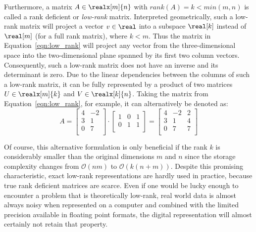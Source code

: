 Furthermore, a matrix $A \in \realx[m]{n}$ with $rank(A)=k < min(m,n)$ is called a rank deficient or \textit{low-rank} matrix. Interpreted geometrically, such a low-rank matrix will project a vector $v \in \real$ into a subspace $\real[k]$ instead of $\real[m]$ (for a full rank matrix), where $k<m$. Thus the matrix in Equation~\hyperref[eqn:low_rank]{\ref{eqn:low_rank}} will project any vector from the three-dimensional space into the two-dimensional plane spanned by its first two column vectors. Consequently, such a low-rank matrix does not have an inverse and its determinant is zero. Due to the linear dependencies between the columns of such a low-rank matrix, it can be fully represented by a product of two matrices $U \in \realx[m]{k}$ and $V \in \realx[k]{n}$. Taking the matrix from Equation~\hyperref[eqn:low_rank]{\ref{eqn:low_rank}}, for example, it can alternatively be denoted as:
\begin{equation}
\label{eqn:low_rank}
 A= \left[
    \begin{array}{cc}
      4 & -2  \\
      3 & 1   \\
      0 & 7   \\
    \end{array}
  \right] \cdot
  \left[
    \begin{array}{ccc}
      1 & 0 & 1 \\
      0 & 1 & 1  \\
    \end{array}
  \right]
 =
 \left[
    \begin{array}{ccc}
      4 & -2 & 2 \\
      3 & 1 & 4  \\
      0 & 7 & 7  \\
    \end{array}
  \right]
\end{equation}

\noindent Of course, this alternative formulation is only beneficial if the rank $k$ is considerably smaller than the original dimensions $m$ and $n$ since the storage complexity changes from $\mathcal{O}(nm)$ to $\mathcal{O}(k(n+m))$. Despite this promising characteristic, exact low-rank representations are hardly used in practice, because true rank deficient matrices are scarce. Even if one would be lucky enough to encounter a problem that is theoretically low-rank, real world data is almost always noisy when represented on a computer and combined with the limited precision available in floating point formats, the digital representation will almost certainly not retain that property. 

